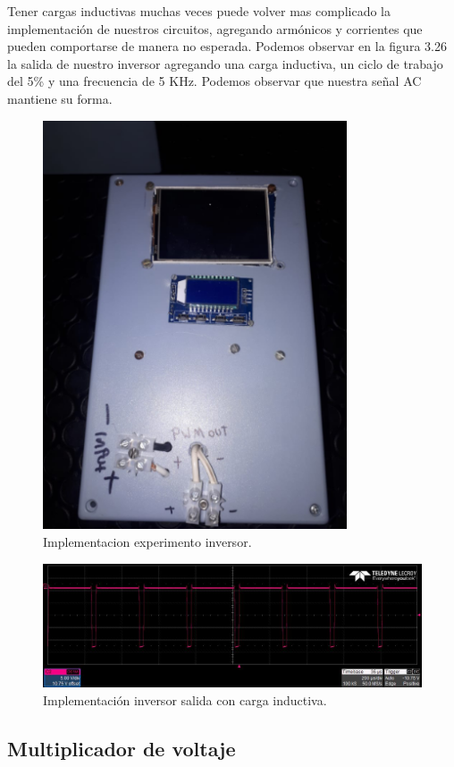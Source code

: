 Tener cargas inductivas muchas veces puede volver mas complicado la implementación de nuestros circuitos, agregando armónicos y corrientes que pueden comportarse de manera no esperada. Podemos observar en la figura 3.26 la salida de nuestro inversor agregando una carga inductiva, un ciclo de trabajo del 5\% y una frecuencia de 5 KHz. Podemos observar que nuestra señal AC mantiene su forma.

\begin{figure}[H]
\centering
\includegraphics[width=9cm]{Capitulo3/figs/inversor.png}
\caption{Implementacion experimento inversor.}
\end{figure}

\begin{figure}[H]
\centering
\includegraphics[width=12cm]{Capitulo3/figs/pwm1.jpg}
\caption{Implementación inversor salida con carga inductiva.}
\end{figure}



\subsection{Multiplicador de voltaje}

